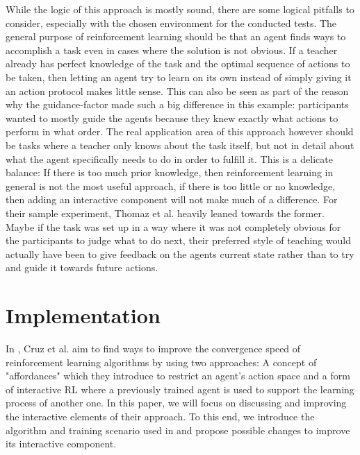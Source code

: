 \documentclass[12pt,twoside]{article}
\theoremstyle{plain}
\theoremstyle{definition}
\theoremstyle{remark}
\begin{document}
While the logic of this approach is mostly sound, there are some logical pitfalls to consider, especially with the chosen environment for the conducted tests. The general purpose of reinforcement learning should be that an agent finds ways to accomplish a task even in cases where the solution is not obvious. If a teacher already has perfect knowledge of the task and the optimal sequence of actions to be taken, then letting an agent try to learn on its own instead of simply giving it an action protocol makes little sense. This can also be seen as part of the reason why the guidance-factor made such a big difference in this example: participants wanted to mostly guide the agents because they knew exactly what actions to perform in what order. The real application area of this approach however should be tasks where a teacher only knows about the task itself, but not in detail about what the agent specifically needs to do in order to fulfill it. This is a delicate balance: If there is too much prior knowledge, then reinforcement learning in general is not the most useful approach, if there is too little or no knowledge, then adding an interactive component will not make much of a difference. For their sample experiment, Thomaz et al. heavily leaned towards the former. Maybe if the task was set up in a way where it was not completely obvious for the participants to judge what to do next, their preferred style of teaching would actually have been to give feedback on the agents current state rather than to try and guide it towards future actions.

\section{Implementation}
In \cite{cruz2014improving}, Cruz et al. aim to find ways to improve the convergence speed of reinforcement learning algorithms by using two approaches: A concept of "affordances" which they introduce to restrict an agent's action space and a form of interactive RL where a previously trained agent is used to support the learning process of another one. In this paper, we will focus on discussing and improving the interactive elements of their approach. To this end, we introduce the algorithm and training scenario used in \cite{cruz2014improving} and propose possible changes to improve its interactive component.
\end{document}
